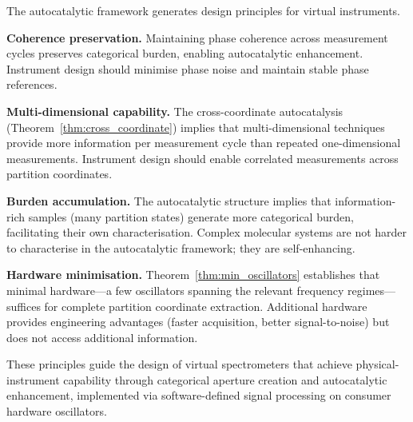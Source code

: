The autocatalytic framework generates design principles for virtual instruments.

\textbf{Coherence preservation.} Maintaining phase coherence across measurement cycles preserves categorical burden, enabling autocatalytic enhancement. Instrument design should minimise phase noise and maintain stable phase references.

\textbf{Multi-dimensional capability.} The cross-coordinate autocatalysis (Theorem~\ref{thm:cross_coordinate}) implies that multi-dimensional techniques provide more information per measurement cycle than repeated one-dimensional measurements. Instrument design should enable correlated measurements across partition coordinates.

\textbf{Burden accumulation.} The autocatalytic structure implies that information-rich samples (many partition states) generate more categorical burden, facilitating their own characterisation. Complex molecular systems are not harder to characterise in the autocatalytic framework; they are self-enhancing.

\textbf{Hardware minimisation.} Theorem~\ref{thm:min_oscillators} establishes that minimal hardware—a few oscillators spanning the relevant frequency regimes—suffices for complete partition coordinate extraction. Additional hardware provides engineering advantages (faster acquisition, better signal-to-noise) but does not access additional information.

These principles guide the design of virtual spectrometers that achieve physical-instrument capability through categorical aperture creation and autocatalytic enhancement, implemented via software-defined signal processing on consumer hardware oscillators.
